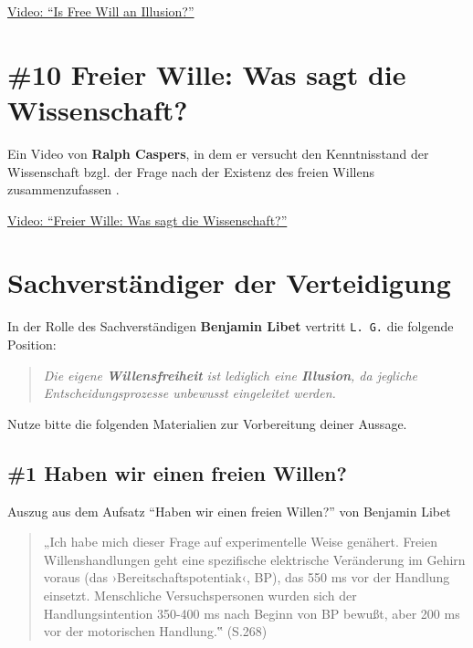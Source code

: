 \documentclass[
  a4paper,
]{report}
\begin{document}
\href{https://www.youtube.com/watch?v=J21bSGGvnD4}{Video: ``Is Free Will an Illusion?''}

\hypertarget{def-ev10}{%
\section{\#10 Freier Wille: Was sagt die Wissenschaft?}\label{def-ev10}}

Ein Video von \textbf{Ralph Caspers}, in dem er versucht den Kenntnisstand der Wissenschaft bzgl. der Frage nach der Existenz des freien Willens zusammenzufassen \citep{Caspers2021}.

\href{https://www.youtube.com/watch?v=45Iut50Cm_Q}{Video: ``Freier Wille: Was sagt die Wissenschaft?''}

\hypertarget{def-expert}{%
\section{Sachverständiger der Verteidigung}\label{def-expert}}

In der Rolle des Sachverständigen \textbf{Benjamin Libet} vertritt \texttt{L.\ G.} die folgende Position:

\begin{quote}
\emph{Die eigene \textbf{Willensfreiheit} ist lediglich eine \textbf{Illusion}, da jegliche Entscheidungsprozesse unbewusst eingeleitet werden.}
\end{quote}

Nutze bitte die folgenden Materialien zur Vorbereitung deiner Aussage.

\hypertarget{def-expert-ev1}{%
\subsection{\#1 Haben wir einen freien Willen?}\label{def-expert-ev1}}

Auszug aus dem Aufsatz ``Haben wir einen freien Willen?'' von Benjamin Libet \citeyearpar{Libet2004}

\begin{quote}
„Ich habe mich dieser Frage auf experimentelle Weise genähert. Freien Willenshandlungen geht eine spezifische elektrische Veränderung im Gehirn voraus (das ›Bereitschaftspotentiak‹, BP), das 550 ms vor der Handlung einsetzt. Menschliche Versuchspersonen wurden sich der Handlungsintention 350-400 ms nach Beginn von BP bewußt, aber 200 ms vor der motorischen Handlung.‟ (S.268)
\end{quote}
\end{document}
